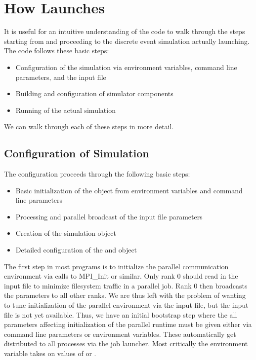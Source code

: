 
\chapter{How \sstmacro Launches}
\label{chapter:launching}

It is useful for an intuitive understanding of the code to walk through the steps starting from  and proceeding to the discrete event simulation actually launching. The code follows these basic steps:

\begin{itemize}
\item Configuration of the simulation via environment variables, command line parameters, and the input file
\item Building and configuration of simulator components
\item Running of the actual simulation
\end{itemize}

We can walk through each of these steps in more detail.

\section{Configuration of Simulation}\label{sec:simConfig}
The configuration proceeds through the following basic steps:
\begin{itemize}
\item Basic initialization of the  object from environment variables and command line parameters
\item Processing and parallel broadcast of the input file parameters
\item Creation of the simulation  object
\item Detailed configuration of the  and  object
\end{itemize}

The first step in most programs is to initialize the parallel communication environment via calls to MPI\_Init or similar.
Only rank 0 should read in the input file to minimize filesystem traffic in a parallel job.
Rank 0 then broadcasts the parameters to all other ranks.
We are thus left with the problem of wanting to tune initialization of the parallel environment via the input file,
but the input file is not yet available.
Thus, we have an initial bootstrap step where the all parameters affecting initialization of the parallel runtime must be given
either via command line parameters or environment variables.
These automatically get distributed to all processes via the job launcher.
Most critically the environment variable  takes on values of  or .

